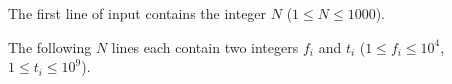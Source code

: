 

The first line of input contains the integer $N$ ($1 \leq N \leq 1000$).

The following $N$ lines each contain two integers $f_i$ and $t_i$ ($1 \leq f_i \leq 10^4$, $1 \leq t_i \leq 10^9$).

